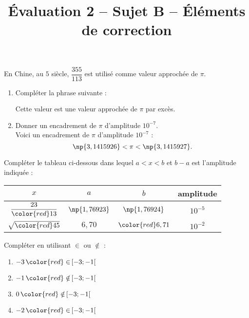 \documentclass[a4paper,dvipsnames]{article}
\begin{document}
\title{Évaluation 2 -- Sujet B -- Éléments de correction}

\date{}
\author{}
\maketitle{}

\pagestyle{empty}

\exo[2 points] En Chine, au $5$\ieme{} siècle, $\dfrac{355}{113}$ est utilisé comme valeur approchée de $\pi$.
\begin{enumerate}
  \item Compléter la phrase suivante :
    \begin{center}
      \og{}Cette valeur est une valeur approchée de $\pi$ par {\color{red}excès}.\fg{}
    \end{center}
  \item Donner un encadrement de $\pi$ d'amplitude $10^{-7}$.\\
    {\color{red}Voici un encadrement de $\pi$ d'amplitude $10^{-7}$ :
    \[\np{3,1415926}<\pi<\np{3,1415927}.\]}
\end{enumerate}

\bigskip

\exo[2 points] Compléter le tableau ci-dessous dans lequel $a<x<b$ et $b-a$ est l'amplitude indiquée :

\begin{center}
  \begin{tabular}{@{}cccc@{}}
    \toprule
    $x$ & $a$ & $b$ & amplitude\\
    \midrule
    \addlinespace[2mm]
    $\dfrac{23}{\color{red}13}$ & $\np{1,76923}$ & $\np{1,76924}$ & {\color{red}$10^{-5}$}\\
    \addlinespace[2mm]
    $\sqrt{\color{red}45}$ & $6,70$ & $\color{red}6,71$ & $10^{-2}$\\
  \end{tabular}
\end{center}

\bigskip

\exo[2 points] Compléter en utilisant $\in$ ou $\notin$ :
\begin{multicols}{4}
  \begin{enumerate}
    \item [] $-3{\,\color{red}\in\,}[-3;-1[$\columnbreak
    \item [] $-1{\,\color{red}\notin\,}[-3;-1[$\columnbreak
    \item [] $0{\,\color{red}\notin\,}[-3;-1[$\columnbreak
    \item [] $-2{\,\color{red}\in\,}[-3;-1[$
  \end{enumerate}
\end{multicols}
\end{document}
